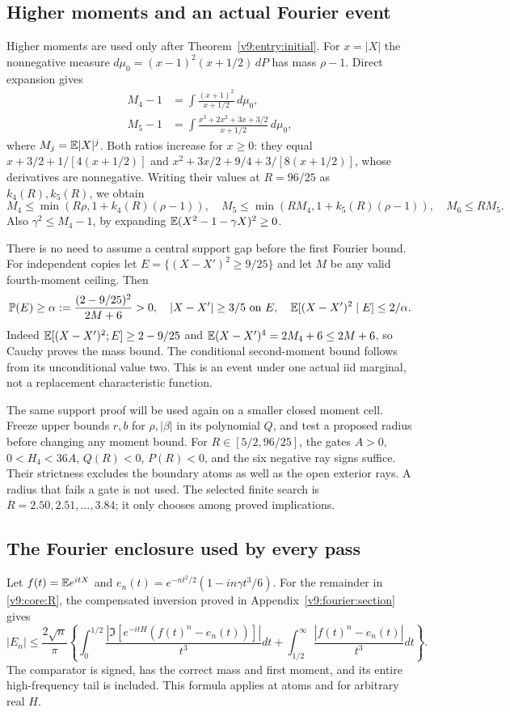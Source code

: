 \subsection{Higher moments and an actual Fourier event}
\label{v9:entry:moments}
Higher moments are used only after Theorem~\ref{v9:entry:initial}.
For $x=|X|$ the nonnegative measure
$d\mu_0=(x-1)^2(x+1/2)\,dP$ has mass $\rho-1$. Direct expansion gives
\begin{align*}
 M_4-1&=\int\frac{(x+1)^2}{x+1/2}\,d\mu_0,\\
 M_5-1&=\int\frac{x^3+2x^2+3x+3/2}{x+1/2}\,d\mu_0,
\end{align*}
where $M_j=\mathbb E|X|^j$. Both ratios increase for $x\ge0$: they equal
$x+3/2+1/[4(x+1/2)]$ and
$x^2+3x/2+9/4+3/[8(x+1/2)]$, whose derivatives are nonnegative.
Writing their values at $R=96/25$ as $k_4(R),k_5(R)$, we obtain
\begin{equation}\label{v9:entry:mom}
 M_4\le\min(R\rho,1+k_4(R)(\rho-1)),\quad
 M_5\le\min(RM_4,1+k_5(R)(\rho-1)),\quad M_6\le RM_5.
\end{equation}
Also $\gamma^2\le M_4-1$, by expanding
$\mathbb E(X^2-1-\gamma X)^2\ge0$.

There is no need to assume a central support gap before the first Fourier
bound. For independent copies let $E=\{(X-X')^2\ge9/25\}$ and let
$M$ be any valid fourth-moment ceiling. Then
\begin{equation}\label{v9:entry:event}
 \mathbb P(E)\ge\alpha:=\frac{(2-9/25)^2}{2M+6}>0,\quad
 |X-X'|\ge3/5\text{ on }E,\quad
 \mathbb E[(X-X')^2\mid E]\le2/\alpha.
\end{equation}
Indeed $\mathbb E[(X-X')^2;E]\ge2-9/25$ and
$\mathbb E(X-X')^4=2M_4+6\le2M+6$, so Cauchy proves the mass bound.
The conditional second-moment bound follows from its unconditional value
two. This is an event under one actual iid marginal, not a replacement
characteristic function.


The same support proof will be used again on a smaller closed moment
cell. Freeze upper bounds $r,b$ for $\rho,|\beta|$ in its polynomial
$Q$, and test a proposed radius before changing any moment bound.
For $R\in[5/2,96/25]$, the gates $A>0$, $0<H_4<36A$, $Q(R)<0$,
$P(R)<0$, and the six negative ray signs suffice. Their strictness
excludes the boundary atoms as well as the open exterior rays. A radius
that fails a gate is not used. The selected finite search is
$R=2.50,2.51,\ldots,3.84$; it only chooses among proved implications.

\subsection{The Fourier enclosure used by every pass}
\label{v9:entry:fourier}
Let $f(t)=\mathbb E e^{itX}$ and
$e_n(t)=e^{-nt^2/2}(1-in\gamma t^3/6)$. For the remainder in
\eqref{v9:core:R}, the compensated inversion proved in
Appendix~\ref{v9:fourier:section} gives
\[
 |E_n|\le\frac{2\sqrt n}{\pi}\left\{
 \int_0^{1/2}\frac{|\Im[e^{-itH}(f(t)^n-e_n(t))]|}{t^3}dt
 +\int_{1/2}^{\infty}\frac{|f(t)^n-e_n(t)|}{t^3}dt\right\}.
\]
The comparator is signed, has the correct mass and first moment, and
its entire high-frequency tail is included. This formula applies at
atoms and for arbitrary real $H$.

